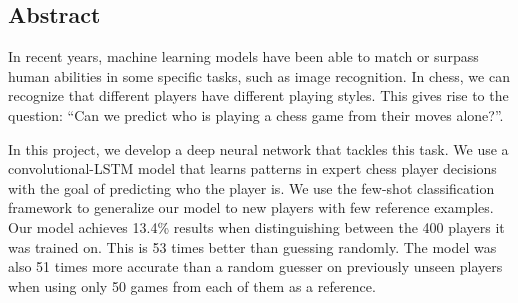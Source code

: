 \newpage
\begin{center}
    \subsection*{Abstract}
\end{center}

\begin{adjustwidth}{1cm}{1cm}
In recent years, machine learning models have been able to match or surpass human abilities in some specific tasks, such as image recognition. In chess, we can recognize that different players have different playing styles. This gives rise to the question: ``Can we predict who is playing a chess game from their moves alone?''.\smallskip\par 
In this project, we develop a deep neural network that tackles this task. We use a convolutional-LSTM model that learns patterns in expert chess player decisions with the goal of predicting who the player is. We use the few-shot classification framework to generalize our model to new players with few reference examples. Our model achieves 13.4\% results when distinguishing between the 400 players it was trained on. This is 53 times better than guessing randomly. The model was also 51 times more accurate than a random guesser on previously unseen players when using only 50 games from each of them as a reference.


 
\end{adjustwidth}

